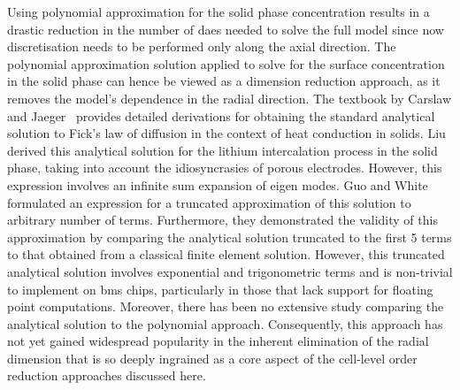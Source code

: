 Using polynomial  approximation for the  solid phase concentration results  in a
drastic reduction  in the number of  \glspl{dae} needed to solve  the full model
since now discretisation  needs to be performed only along  the axial direction.
The  polynomial  approximation  solution  applied   to  solve  for  the  surface
concentration in  the solid phase can  hence be viewed as  a dimension reduction
approach, as  it removes  the model's  dependence in  the radial  direction. The
textbook by Carslaw and  Jaeger~\cite{Carslaw1947} provides detailed derivations
for obtaining the standard analytical solution to Fick's law of diffusion in the
context of heat conduction in solids. Liu~\cite{Liu2006} derived this analytical
solution for the  lithium intercalation process in the solid  phase, taking into
account  the idiosyncrasies  of porous  electrodes. However, this  expression involves an  infinite sum
expansion of eigen modes. Guo  and White~\cite{Guo2012} formulated an expression
for a  truncated approximation of  this solution  to arbitrary number  of terms.
Furthermore, they demonstrated  the validity of this  approximation by comparing
the analytical solution truncated  to the first 5 terms to  that obtained from a
classical finite  element solution. However, this  truncated analytical solution
involves exponential and trigonometric terms  and is non-trivial to implement on
\gls{bms}  chips, particularly  in those  that lack  support for  floating point
computations.  Moreover,  there  has  been  no  extensive  study  comparing  the
analytical solution to the polynomial  approach. Consequently, this approach has
not yet gained  widespread popularity in the inherent elimination  of the radial
dimension that is so  deeply ingrained as a core aspect  of the cell-level order
reduction  approaches  discussed  here.


